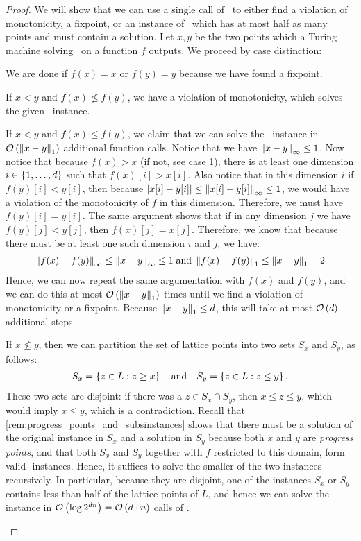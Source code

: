 \begin{proof}
	We will show that we can use a single call of \Tarskistar\ to either find a violation of monotonicity, a fixpoint, or an instance of \Tarski\, which has at most half as many points and must contain a solution. Let $x, y$ be the two points which a Turing machine solving \Tarskistar\ on a function $f$ outputs. We proceed by case distinction:
	\begin{case}{1}
		We are done if $f(x) = x$ or $f(y) = y$ because we have found a fixpoint.
	\end{case}
	\begin{case}{2.1}
		If $x < y$ and $f(x) \not\leq f(y)$, we have a violation of monotonicity, which solves the given \Tarski\ instance.
	\end{case}
	\begin{case}{2.2}
		If $x < y$ and $f(x) \leq f(y)$, we claim that we can solve the \Tarski\ instance in $\mathcal{O}\left(\left\lVert x - y\right\rVert_{1}\right)$ additional function calls. Notice that we have $\left\lVert x-y\right\rVert_{\infty} \leq 1$. Now notice that because $f(x) > x$ (if not, see case 1), there is at least one dimension $i \in \left\{1, \dots, d\right\}$ such that $f(x)[i] > x[i]$. Also notice that in this dimension $i$ if $f(y)[i] < y[i]$, then because $\left\lvert x[i] - y[i]\right\rvert \leq \left\lVert x[i] - y[i]\right\rVert_{\infty} \leq 1$, we would have a violation of the monotonicity of $f$ in this dimension. Therefore, we must have $f(y)[i] = y[i]$. The same argument shows that if in any dimension $j$ we have $f(y)[j] < y[j]$, then $f(x)[j] = x[j]$. Therefore, we know that because there must be at least one such dimension $i$ and $j$, we have:
		\begin{align*}
			\left\lVert f(x) - f(y)\right\rVert_{\infty} \leq \left\lVert x - y\right\rVert_{\infty} \leq 1 \; \text{and} \; \left\lVert f(x) - f(y)\right\rVert_{1} \leq \left\lVert x - y\right\rVert_{1} - 2
		\end{align*}
		Hence, we can now repeat the same argumentation with $f(x)$ and $f(y)$, and we can do this at most $\mathcal{O}\left(\left\lVert x - y\right\rVert_{1}\right)$ times until we find a violation of monotonicity or a fixpoint. Because $\left\lVert x - y\right\rVert_{1} \leq d$, this will take at most $\mathcal{O}\left(d\right)$ additional steps.
	\end{case}
	\begin{case}{3}
		If $x \not\leq y$, then we can partition the set of lattice points into two sets $S_x$ and $S_y$, as follows:
		\begin{align*}
			S_x = \left\{z \in L : z \geq x\right\} \quad \text{and} \quad S_y = \left\{z \in L : z \leq y\right\}.
		\end{align*}
		These two sets are disjoint: if there was a $z \in S_x \cap S_y$, then $x \leq z \leq y$, which would imply $x \leq y$, which is a contradiction. Recall that \cref{rem:progress_points_and_subsinstances} shows that there must be a solution of the original instance in $S_x$ and a solution in $S_y$ because both $x$ and $y$ are \emph{progress points}, and that both $S_x$ and $S_y$ together with $f$ restricted to this domain, form valid \Tarski-instances. Hence, it suffices to solve the smaller of the two instances recursively. In particular, because they are disjoint, one of the instances $S_x$ or $S_y$ contains less than half of the lattice points of $L$, and hence we can solve the instance in $\mathcal{O}\left(\log{2^{dn}}\right) = \mathcal{O}\left(d \cdot n\right)$ calls of \Tarskistar.

\end{case}
\end{proof}
